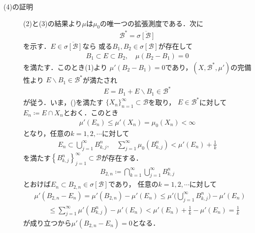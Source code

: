 \begin{prf}
\begin{description}
				\item[(4)の証明]
					(2)と(3)の結果より$\mu$は$\mu_0$の唯一つの拡張測度である．次に
					\begin{align}
						\mathcal{B}^* = \overline{\sigma[\mathcal{B}]}
					\end{align}
					を示す．$E \in \overline{\sigma[\mathcal{B}]}$なら
					或る$B_1,B_2 \in \sigma[\mathcal{B}]$が存在して
					\begin{align}
						B_1 \subset E \subset B_2, \quad \mu(B_2 - B_1) = 0
					\end{align}
					を満たす．このとき(1)より
					$\mu'(B_2 - B_1) = 0$であり，$\left( X,\mathcal{B}^*,\mu' \right)$の完備性より
					$E \backslash B_1 \in \mathcal{B}^*$が満たされ
					\begin{align}
						E = B_1 + E \backslash B_1 \in \mathcal{B}^*
					\end{align}
					が従う．いま，()を満たす
					$\{X_n\}_{n=1}^\infty \subset \mathcal{B}$を取り，
					$E \in \mathcal{B}^*$に対して$E_n \coloneqq E \cap X_n$とおく．このとき
					\begin{align}
						\mu'(E_n) \leq \mu'(X_n) = \mu_0(X_n) < \infty
					\end{align}
					となり，任意の$k = 1,2,\cdots$に対して
					\begin{align}
						E_n \subset \bigcup_{j=1}^\infty B^n_{k,j},
						\quad
						\sum_{j=1}^\infty \mu_0\left( B^n_{k,j} \right)
						< \mu'(E_n) + \frac{1}{k}
					\end{align}
					を満たす$\left\{B^n_{k,j}\right\}_{j=1}^\infty \subset \mathcal{B}$が存在する．
					\begin{align}
						B_{2,n} \coloneqq \bigcap_{k=1}^\infty \bigcup_{j=1}^\infty B^n_{k,j}
					\end{align}
					とおけば$E_n \subset B_{2,n} \in \sigma[\mathcal{B}]$であり，
					任意の$k = 1,2,\cdots$に対して
					\begin{align}
						&\mu'(B_{2,n} - E_n) = \mu'(B_{2,n}) - \mu'(E_n)
						\leq \mu'\Biggl( \bigcup_{j=1}^\infty B^n_{k,j} \Biggr) - \mu'(E_n) \\
						&\qquad \leq \sum_{j=1}^\infty \mu'\left( B^n_{k,j} \right) - \mu'(E_n)
						< \mu'(E_n) + \frac{1}{k} - \mu'(E_n)
						= \frac{1}{k}
					\end{align}
					が成り立つから$\mu'(B_{2,n} - E_n) = 0$となる．
			\end{description}
		\end{prf}